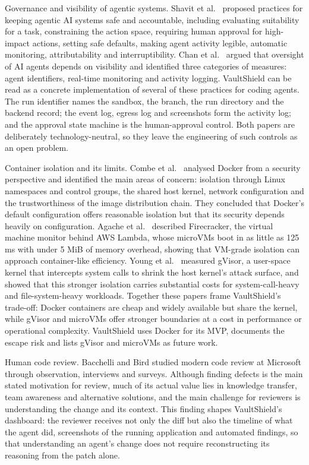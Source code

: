 \documentclass[12pt,a4paper,oneside]{report}
\begin{document}
Governance and visibility of agentic systems. Shavit et al.~\cite{ref9} proposed practices for keeping agentic AI systems safe and accountable, including evaluating suitability for a task, constraining the action space, requiring human approval for high-impact actions, setting safe defaults, making agent activity legible, automatic monitoring, attributability and interruptibility. Chan et al.~\cite{ref10} argued that oversight of AI agents depends on visibility and identified three categories of measures: agent identifiers, real-time monitoring and activity logging. VaultShield can be read as a concrete implementation of several of these practices for coding agents. The run identifier names the sandbox, the branch, the run directory and the backend record; the event log, egress log and screenshots form the activity log; and the approval state machine is the human-approval control. Both papers are deliberately technology-neutral, so they leave the engineering of such controls as an open problem.

Container isolation and its limits. Combe et al.~\cite{ref11} analysed Docker from a security perspective and identified the main areas of concern: isolation through Linux namespaces and control groups, the shared host kernel, network configuration and the trustworthiness of the image distribution chain. They concluded that Docker's default configuration offers reasonable isolation but that its security depends heavily on configuration. Agache et al.~\cite{ref12} described Firecracker, the virtual machine monitor behind AWS Lambda, whose microVMs boot in as little as 125 ms with under 5 MiB of memory overhead, showing that VM-grade isolation can approach container-like efficiency. Young et al.~\cite{ref13} measured gVisor, a user-space kernel that intercepts system calls to shrink the host kernel's attack surface, and showed that this stronger isolation carries substantial costs for system-call-heavy and file-system-heavy workloads. Together these papers frame VaultShield's trade-off: Docker containers are cheap and widely available but share the kernel, while gVisor and microVMs offer stronger boundaries at a cost in performance or operational complexity. VaultShield uses Docker for its MVP, documents the escape risk and lists gVisor and microVMs as future work.

Human code review. Bacchelli and Bird \cite{ref14} studied modern code review at Microsoft through observation, interviews and surveys. Although finding defects is the main stated motivation for review, much of its actual value lies in knowledge transfer, team awareness and alternative solutions, and the main challenge for reviewers is understanding the change and its context. This finding shapes VaultShield's dashboard: the reviewer receives not only the diff but also the timeline of what the agent did, screenshots of the running application and automated findings, so that understanding an agent's change does not require reconstructing its reasoning from the patch alone.
\end{document}

